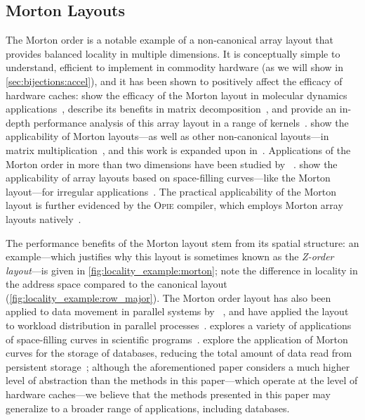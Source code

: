 \subsection{Morton Layouts}

The Morton order is a notable example of a non-canonical array layout that provides balanced locality in multiple dimensions. It is conceptually simple to understand, efficient to implement in commodity hardware (as we will show in \cref{sec:bijections:accel}), and it has been shown to positively affect the efficacy of hardware caches: \citeauthor{doi:10.1177/1094342019846282} show the efficacy of the Morton layout in molecular dynamics applications~\cite{doi:10.1177/1094342019846282},  \citeauthor{9378385} describe its benefits in matrix decomposition~\cite{9378385}, and \citeauthor{10.1002/cpe.1018} provide an in-depth performance analysis of this array layout in a range of kernels~\cite{10.1002/cpe.1018}. \citeauthor{10.1145/305619.305645} show the applicability of Morton layouts---as well as other non-canonical layouts---in matrix multiplication~\cite{10.1145/305619.305645}, and this work is expanded upon in~\cite{10.1145/305138.305231}. Applications of the Morton order in more than two dimensions have been studied by \citeauthor{PAWLOWSKI201934}~\cite{PAWLOWSKI201934}. \citeauthor{Mellor-Crummey2001} show the applicability of array layouts based on space-filling curves---like the Morton layout---for irregular applications~\cite{Mellor-Crummey2001}. The practical applicability of the Morton layout is further evidenced by the \textsc{Opie} compiler, which employs Morton array layouts natively~\cite{10.1145/1054943.1054962}.

The performance benefits of the Morton layout stem from its spatial structure: an example---which justifies why this layout is sometimes known as the \emph{Z-order layout}---is given in \cref{fig:locality_example:morton}; note the difference in locality in the address space compared to the canonical layout (\cref{fig:locality_example:row_major}). The Morton order layout has also been applied to data movement in parallel systems by \citeauthor{walker2023impact}~\cite{walker2023impact}, and \citeauthor{6687350} have applied the layout to workload distribution in parallel processes~\cite{6687350}. \citeauthor{bader2012space} explores a variety of applications of space-filling curves in scientific programs~\cite{bader2012space}. \citeauthor{10.14778/3415478.3415560} explore the application of Morton curves for the storage of databases, reducing the total amount of data read from persistent storage~\cite{10.14778/3415478.3415560}; although the aforementioned paper considers a much higher level of abstraction than the methods in this paper---which operate at the level of hardware caches---we believe that the methods presented in this paper may generalize to a broader range of applications, including databases.


